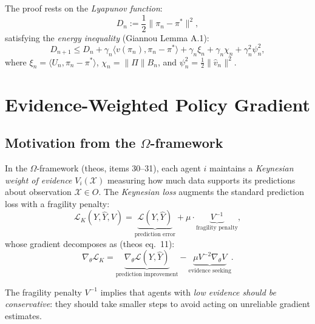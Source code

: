 \documentclass[11pt,a4paper]{article}
\newcommand{\ip}[2]{\langle #1, #2 \rangle}
\begin{document}
The proof rests on the \emph{Lyapunov function}:
\begin{equation}
\label{eq:lyapunov}
    D_n := \frac{1}{2}\|\pi_n - \pi^*\|^2,
\end{equation}
satisfying the \emph{energy inequality} (Giannou Lemma A.1):
\begin{equation}
\label{eq:energy-std}
\boxed{
    D_{n+1} \leq D_n + \gamma_n \ip{v(\pi_n)}{\pi_n - \pi^*} + \gamma_n \xi_n + \gamma_n \chi_n + \gamma_n^2 \psi_n^2,
}
\end{equation}
where $\xi_n = \ip{U_n}{\pi_n - \pi^*}$, $\chi_n = \|\Pi\| B_n$, and $\psi_n^2 = \tfrac{1}{2}\|\hat{v}_n\|^2$.


\section{Evidence-Weighted Policy Gradient}
\label{sec:ewpg}

\subsection{Motivation from the $\Omega$-framework}

In the $\Omega$-framework (theos, items 30--31), each agent $i$ maintains a \emph{Keynesian weight of evidence} $V_i(\mathcal{X})$ measuring how much data supports its predictions about observation $\mathcal{X} \in O$. The \emph{Keynesian loss} augments the standard prediction loss with a fragility penalty:
\begin{equation}
\label{eq:keynesian-loss}
    \mathcal{L}_K(Y, \hat{Y}, V) = \underbrace{\mathcal{L}(Y, \hat{Y})}_{\text{prediction error}} + \mu \cdot \underbrace{V^{-1}}_{\text{fragility penalty}},
\end{equation}
whose gradient decomposes as (theos eq.\ 11):
\begin{equation}
\label{eq:keynesian-gradient}
    \nabla_\theta \mathcal{L}_K = \underbrace{\nabla_\theta \mathcal{L}(Y, \hat{Y})}_{\text{prediction improvement}} - \underbrace{\mu V^{-2} \nabla_\theta V}_{\text{evidence seeking}}.
\end{equation}

The fragility penalty $V^{-1}$ implies that agents with \emph{low evidence should be conservative}: they should take smaller steps to avoid acting on unreliable gradient estimates.
\end{document}

